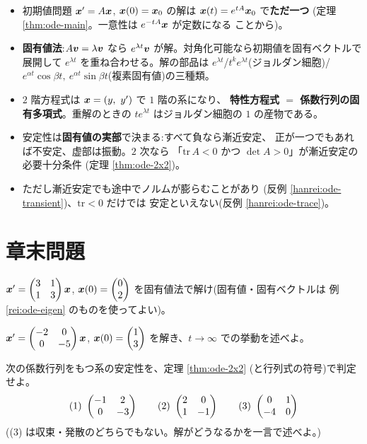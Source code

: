 \begin{matome}
\begin{itemize}
\item 初期値問題 $\bm{x}' = A\bm{x}$, $\bm{x}(0) = \bm{x}_0$ の解は
$\bm{x}(t) = e^{tA}\bm{x}_0$ で\textbf{ただ一つ}
(定理 \ref{thm:ode-main}。一意性は $e^{-tA}\bm{x}$ が定数になる
ことから)。
\item \textbf{固有値法}:$A\bm{v} = \lambda\bm{v}$ なら
$e^{\lambda t}\bm{v}$ が解。対角化可能なら初期値を固有ベクトルで
展開して $e^{\lambda t}$ を重ね合わせる。解の部品は
$e^{\lambda t}$/$t^k e^{\lambda t}$(ジョルダン細胞)/
$e^{\alpha t}\cos\beta t,\ e^{\alpha t}\sin\beta t$(複素固有値)の三種類。
\item $2$ 階方程式は $\bm{x} = (y,\ y')$ で $1$ 階の系になり、
\textbf{特性方程式 $=$ 係数行列の固有多項式}。重解のときの
$te^{\lambda t}$ はジョルダン細胞の $1$ の産物である。
\item 安定性は\textbf{固有値の実部}で決まる:すべて負なら漸近安定、
正が一つでもあれば不安定、虚部は振動。$2$ 次なら
「$\mathrm{tr}\,A < 0$ かつ $\det A > 0$」が漸近安定の必要十分条件
(定理 \ref{thm:ode-2x2})。
\item ただし漸近安定でも途中でノルムが膨らむことがあり
(反例 \ref{hanrei:ode-transient})、$\mathrm{tr} < 0$ だけでは
安定といえない(反例 \ref{hanrei:ode-trace})。
\end{itemize}
\end{matome}

\section*{章末問題}

\begin{mondai}[基本]\label{q:ode-ex1}
$\bm{x}' = \begin{pmatrix}3 & 1 \\ 1 & 3\end{pmatrix}\bm{x}$,
$\bm{x}(0) = \begin{pmatrix}0 \\ 2\end{pmatrix}$ を固有値法で解け(固有値・固有ベクトルは
例 \ref{rei:ode-eigen} のものを使ってよい)。
\end{mondai}

\begin{mondai}[基本]\label{q:ode-ex2}
$\bm{x}' = \begin{pmatrix}-2 & 0 \\ 0 & -5\end{pmatrix}\bm{x}$,
$\bm{x}(0) = \begin{pmatrix}1 \\ 3\end{pmatrix}$ を解き、$t \to \infty$ での挙動を述べよ。
\end{mondai}

\begin{mondai}[基本]\label{q:ode-ex3}
次の係数行列をもつ系の安定性を、定理 \ref{thm:ode-2x2}
(と行列式の符号)で判定せよ。
\[
(1)\ \begin{pmatrix}-1 & 2 \\ 0 & -3\end{pmatrix} \qquad
(2)\ \begin{pmatrix}2 & 0 \\ 1 & -1\end{pmatrix} \qquad
(3)\ \begin{pmatrix}0 & 1 \\ -4 & 0\end{pmatrix}
\]
((3) は収束・発散のどちらでもない。解がどうなるかを一言で述べよ。)
\end{mondai}

